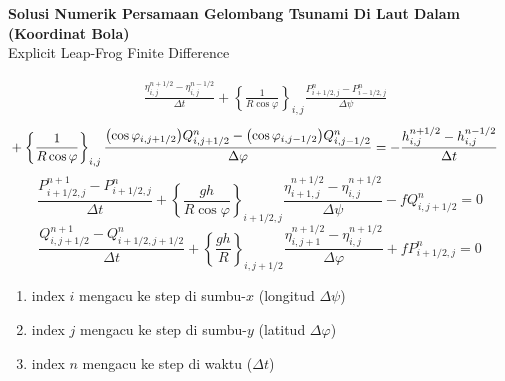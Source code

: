 \documentclass{article}
\begin{document}
\begin{center}
    \textbf{Solusi Numerik Persamaan Gelombang Tsunami Di Laut Dalam (Koordinat Bola)}
    \\Explicit Leap-Frog Finite Difference
\end{center}
\begin{align*}
    &\frac{\eta_{i,j}^{n+1/2}-\eta_{i,j}^{n-1/2}}{\Delta t} 
    + \left\{\frac{1}{R\cos \varphi}\right\}_{i,j}\frac{P_{i+1/2,j}^n-P_{i-1/2,j}^n}{\Delta\psi}
\end{align*}
\begin{align}
    &+ \left\{\frac{1}{R\cos \varphi}\right\}_{i,j}\frac{\oio*{\cos\varphi_{i,j+1/2}}Q_{i,j+1/2}^n-\oio*{\cos\varphi_{i,j-1/2}}Q_{i,j-1/2}^n}
    {\Delta \varphi} = -\frac{h_{i,j}^{n+1/2}-h_{i,j}^{n-1/2}}{\Delta t}
\end{align}
\begin{equation}
    \frac{P_{i+1/2,j}^{n+1}-P_{i+1/2,j}^n}{\Delta t} 
    + \left\{\frac{gh}{R\cos\varphi}\right\}_{i+1/2,j}
    \frac{\eta_{i+1,j}^{n+1/2}-\eta_{i,j}^{n+1/2}}{\Delta\psi}
    -fQ_{i,j+1/2}^n=0
\end{equation}
\begin{equation}
    \frac{Q_{i,j+1/2}^{n+1}-Q_{i+1/2,j+1/2}^n}{\Delta t} 
    + \left\{\frac{gh}{R}\right\}_{i,j+1/2}
    \frac{\eta_{i,j+1}^{n+1/2}-\eta_{i,j}^{n+1/2}}{\Delta\varphi}
    +fP_{i+1/2,j}^n=0
\end{equation}

\begin{enumerate}
    \item index $i$ mengacu ke step di sumbu-$x$ (longitud $\Delta\psi$)
    \item index $j$ mengacu ke step di sumbu-$y$ (latitud $\Delta\varphi$)
    \item index $n$ mengacu ke step di waktu ($\Delta t$)
\end{enumerate}
\end{document}
